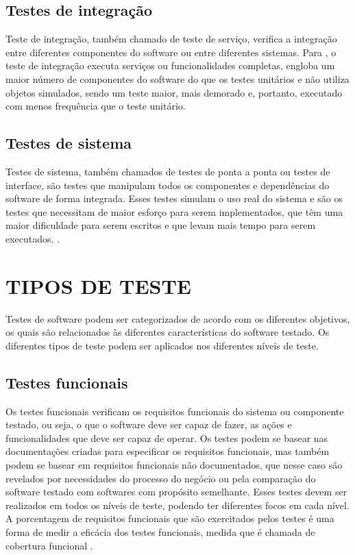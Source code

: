         \subsection{Testes de integração}

        Teste de integração, também chamado de teste de serviço, verifica a integração entre diferentes componentes do software ou entre diferentes sistemas. Para , o teste de integração executa serviços ou funcionalidades completas, engloba um maior número de componentes do software do que os testes unitários e não utiliza objetos simulados, sendo um teste maior, mais demorado e, portanto, executado com menos frequência que o teste unitário.

        \subsection{Testes de sistema}
        
        Testes de sistema, também chamados de testes de ponta a ponta ou testes de interface, são testes que manipulam todos os componentes e dependências do software de forma integrada. Esses testes simulam o uso real do sistema e são os testes que necessitam de maior esforço para serem implementados, que têm uma maior dificuldade para serem escritos e que levam mais tempo para serem executados. \cite{Valente2020}.

    \section{TIPOS DE TESTE}
    
    Testes de software podem ser categorizados de acordo com os diferentes objetivos, os quais são relacionados às diferentes características do software testado. Os diferentes tipos de teste podem ser aplicados nos diferentes níveis de teste.
        
        \subsection{Testes funcionais}
        \label{section:testes-funcionais}
        
        Os testes funcionais verificam os requisitos funcionais do sistema ou componente testado, ou seja, o que o software deve ser capaz de fazer, as ações e funcionalidades que deve ser capaz de operar. Os testes podem se basear nas documentações criadas para especificar os requisitos funcionais, mas também podem se basear em requisitos funcionais não documentados, que nesse caso são revelados por necessidades do processo do negócio ou pela comparação do software testado com softwares com propósito semelhante. Esses testes devem ser realizados em todos os níveis de teste, podendo ter diferentes focos em cada nível. A porcentagem de requisitos funcionais que são exercitados pelos testes é uma forma de medir a eficácia dos testes funcionais, medida que é chamada de cobertura funcional \cite{ISQTB2019}.
        
